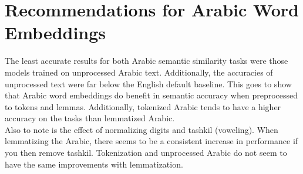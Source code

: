 \section{Recommendations for Arabic Word Embeddings}
\label{sec:recommendations}

The least accurate results for both Arabic semantic similarity tasks were those models trained on unprocessed Arabic text. Additionally, the accuracies of unprocessed text were far below the English default baseline. This goes to show that Arabic word embeddings do benefit in semantic accuracy when preprocessed to tokens and lemmas. Additionally, tokenized Arabic tends to have a higher accuracy on the tasks than lemmatized Arabic. \\
Also to note is the effect of normalizing digits and tashkil (voweling). When lemmatizing the Arabic, there seems to be a consistent increase in performance if you then remove tashkil. Tokenization and unprocessed Arabic do not seem to have the same improvements with lemmatization. \\


